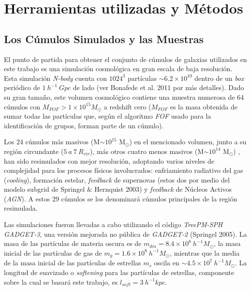 
\chapter{Herramientas utilizadas y M\'etodos} %

\label{ch:tools} %




\section{Los C\'umulos Simulados y las Muestras}
\label{sec:muestra}
El punto de partida para obtener el conjunto de c\'umulos de galaxias utilizados en este trabajo 
es una simulaci\'on cosmol\'ogica en gran escala de baja resoluci\'on. Esta simulaci\'on {\it N-body} 
cuenta con $1024^3$ part\'iculas $\sim 6.2\times10^{10}$ dentro de un \textit{box} peri\'odico de $1~h^{-1}~Gpc$ de 
lado (ver Bonafede et al. 2011 por m\'as detalles). Dado su gran tama\~no, este volumen cosmol\'ogico contiene 
una muestra numerosa de 64 c\'umulos con $M_{FOF} > 1\times10^{15}  M_{\odot}$  a redshift cero ($M_{FOF}$ es 
la masa obtenida de sumar todas las part\'iculas que,
seg\'un el algoritmo {\it FOF} usado para la identificaci\'on de grupos, forman parte de un c\'umulo).  

Los 24 c\'umulos m\'as masivos (M$\sim 10^{15}$ M$_{\odot}$) en el mencionado volumen, junto a su regi\'on circundante ($5~ a~ 7~R_{vir}$), m\'as
otros cuatro menos masivos (M$\sim 10^{14}$ M$_{\odot}$) , han sido resimulados con mejor resoluci\'on, adoptando varios niveles de complejidad para 
los procesos f\'isicos involucrados: enfriamiento radiativo del gas ({\it cooling}), formaci\'on estelar, {\it feedback} de supernovas 
(estos dos por medio del modelo subgrid de Springel $\&$ Hernquist 2003) y {\it feedback} de N\'ucleos Activos ({\it AGN}). 
A estos 29 c\'umulos se los denominar\'a c\'umulos principales de la regi\'on resimulada.


Las simulaciones fueron llevadas a cabo utilizando el c\'odigo {\it TreePM-SPH GADGET-3}, una versi\'on mejorada no p\'ublica de {\it GADGET-2} 
(Springel 2005). La masa de las part\'iculas de materia oscura es de $m_{dm}=8.4\times10^8~h^{-1}M_{\odot}$, 
la masa inicial de las part\'iculas 
de gas de $m_{g}=1.6\times10^8~h^{-1}M_{\odot}$, mientras que la media de la masa inicial de las part\'iculas de estrellas 
$m_{s}$ oscila en $\sim 4.5 \times 10^7 ~h^{-1}M_{\odot}$. La longitud de suavizado o {\it softening} para las part\'iculas de estrellas, 
componente sobre la cual se basar\'a este trabajo, es  $l_{soft}=3~h^{-1}kpc$.


